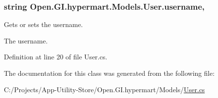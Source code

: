 \subsubsection[{username}]{\setlength{\rightskip}{0pt plus 5cm}string Open.\+G\+I.\+hypermart.\+Models.\+User.\+username\hspace{0.3cm}{\ttfamily [get]}, {\ttfamily [set]}}\label{class_open_1_1_g_i_1_1hypermart_1_1_models_1_1_user_a8681bb284b2bce5e87537a5dedc2dc05}


Gets or sets the username. 

The username. 

Definition at line 20 of file User.\+cs.



The documentation for this class was generated from the following file\+:\begin{DoxyCompactItemize}
\item 
C\+:/\+Projects/\+App-\/\+Utility-\/\+Store/\+Open.\+G\+I.\+hypermart/\+Models/\hyperlink{_models_2_user_8cs}{User.\+cs}\end{DoxyCompactItemize}
